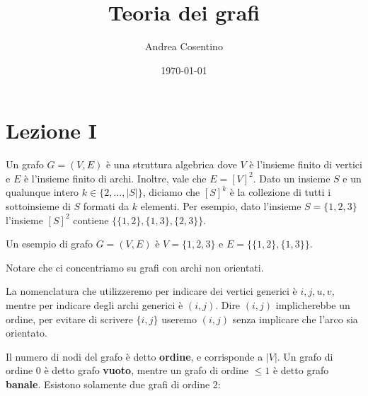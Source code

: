 \documentclass[12pt]{report}
\title{Teoria dei grafi}
\author{Andrea Cosentino}
\date{\today}
\begin{document}
\maketitle

\tableofcontents
\setlength{\columnsep}{0.8cm}
\setlength{\columnseprule}{0.2pt}
\twocolumn
\chapter{Lezione I}
\noindent
Un grafo $G = (V,E)$ è una struttura algebrica dove $V$ è l'insieme finito di vertici e $E$ è l'insieme finito di archi. Inoltre, vale che $E = [V]^2$. Dato un insieme $S$ e un qualunque intero $k \in \{2,\dots,|S|\}$, diciamo che $[S]^k$ è la collezione di tutti i sottoinsieme di $S$ formati da $k$ elementi. Per esempio, dato l'insieme $S = \{1,2,3\}$ l'insieme $[S]^2$ contiene $\{\{1,2\}, \{1,3\},\{2,3\}\}$. 

\begin{exmp}
    Un esempio di grafo $G = (V,E)$ è $V = \{1,2,3\}$ e $E = \{\{1,2\},\{1,3\}\}$.
    
\vspace{10px}
\begin{center}
\end{center}
\end{exmp}

\noindent
Notare che ci concentriamo su grafi con archi non orientati.

La nomenclatura che utilizzeremo per indicare dei vertici generici è $i,j,u,v$, mentre per indicare degli archi generici è $(i,j)$. Dire $(i,j)$ implicherebbe un ordine, per evitare di scrivere $\{i,j\}$ useremo $(i,j)$ senza implicare che l'arco sia orientato.

Il numero di nodi del grafo è detto \textbf{ordine}, e corrisponde a $|V|$. Un grafo di ordine $0$ è detto grafo \textbf{vuoto}, mentre un grafo di ordine $\leq 1$ è detto grafo \textbf{banale}. Esistono solamente due grafi di ordine $2$:

\end{document}
